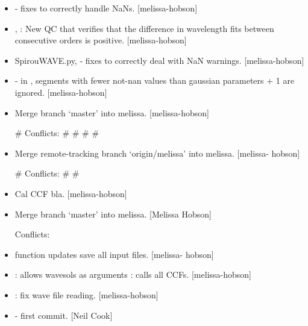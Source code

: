 \documentclass[a4paper,10pt,english]{report}
\begin{document}
\begin{itemize}
\item {} 
 - fixes to correctly handle NaNs.
{[}melissa-hobson{]}

\item {} 
, : New QC that verifies that the
difference in wavelength fits between consecutive orders is positive.
{[}melissa-hobson{]}

\item {} 
SpirouWAVE.py,  - fixes to correctly deal with NaN
warnings. {[}melissa-hobson{]}

\item {} 
 - in , segments with fewer not-nan
values than gaussian parameters + 1 are ignored. {[}melissa-hobson{]}

\item {} 
Merge branch ‘master’ into melissa. {[}melissa-hobson{]}

\# Conflicts:
\#    
\#    
\#    
\#    

\item {} 
Merge remote-tracking branch ‘origin/melissa’ into melissa. {[}melissa-
hobson{]}

\# Conflicts:
\#    
\#    

\item {} 
Cal CCF bla. {[}melissa-hobson{]}

\item {} 
Merge branch ‘master’ into melissa. {[}Melissa Hobson{]}
\begin{description}
\item[{Conflicts:}] \leavevmode
{}

\end{description}

\item {} 
 function updates  save all input files. {[}melissa-
hobson{]}

\item {} 
: allows wavesols as arguments : calls all CCFs.
{[}melissa-hobson{]}

\item {} 
: fix wave file reading. {[}melissa-hobson{]}

\item {} 
 - first commit. {[}Neil Cook{]}

\end{itemize}
\end{document}
